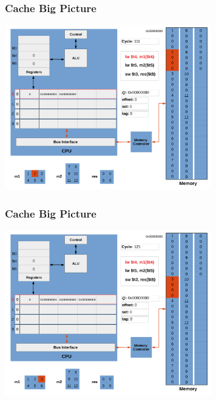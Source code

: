 \documentclass{beamer}
\begin{document}
\begin{frame}[fragile]
\frametitle{Cache Big Picture}

\begin{center}
\vspace*{-0.23cm}
\hspace*{-1cm}\includegraphics[width=9cm]{cache5.pdf}
\end{center}

\end{frame}

\begin{frame}[fragile]
\frametitle{Cache Big Picture}

\begin{center}
\vspace*{-0.23cm}
\hspace*{-1cm}\includegraphics[width=9cm]{cache6.pdf}
\end{center}

\end{frame}
\end{document}
